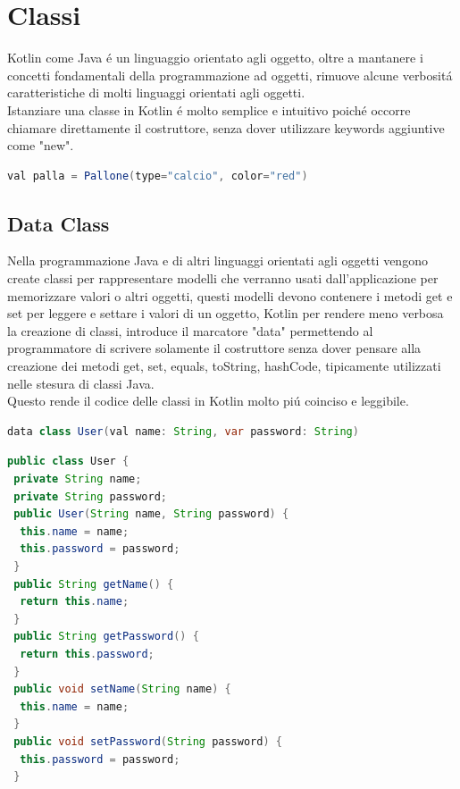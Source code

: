 \section{Classi}

Kotlin come Java \'e un linguaggio orientato agli oggetto, oltre a mantanere i concetti fondamentali della programmazione ad oggetti, rimuove alcune verbosit\'a caratteristiche di molti linguaggi orientati agli oggetti.\\
Istanziare una classe in Kotlin \'e molto semplice e intuitivo poich\'e occorre chiamare direttamente il costruttore, senza dover utilizzare keywords aggiuntive come "new".

\begin{lstlisting}[language=java,caption={Esempio class Kotlin}]
val palla = Pallone(type="calcio", color="red")
\end{lstlisting}



\subsection{Data Class}

Nella programmazione Java e di altri linguaggi orientati agli oggetti vengono create classi per rappresentare modelli che verranno usati dall'applicazione per memorizzare valori o altri oggetti, questi modelli devono contenere i metodi get e set per leggere e settare i valori di un oggetto, Kotlin per rendere meno verbosa la creazione di classi, introduce il marcatore "data" permettendo al programmatore di scrivere solamente il costruttore senza dover pensare alla creazione dei metodi get, set, equals, toString, hashCode, tipicamente utilizzati nelle stesura di classi Java.\\
Questo rende il codice delle classi in Kotlin molto pi\'u coinciso e leggibile.

\begin{lstlisting}[language=java,caption={Esempio dataclass Kotlin}]
data class User(val name: String, var password: String)
\end{lstlisting}

\begin{lstlisting}[language=java,caption={Esempio classe Java}]
public class User {
 private String name;
 private String password;
 public User(String name, String password) {
  this.name = name;
  this.password = password;
 }
 public String getName() {
  return this.name;
 }
 public String getPassword() {
  return this.password;
 }
 public void setName(String name) {
  this.name = name;
 }
 public void setPassword(String password) {
  this.password = password;
 }
\end{lstlisting}




